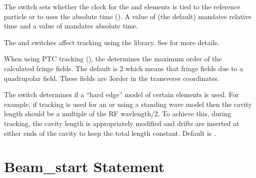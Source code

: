 The  switch sets whether the clock for the
 and  elements is tied to the reference
particle or to uses the absolute time (). A value of
 (the default) mandates relative time and a value of
 mandates absolute time.

The  and  switches affect
tracking using the  library. See  for more
details.

When using PTC tracking (), the
 determines the maximum order of
the calculated fringe fields. The default is 2 which means that fringe
fields due to a quadrupolar field. These fields are 3\Rd order in the
transverse coordinates.

The  switch determines if a ``hard edge''
model of certain elements is used. For example, if 
tracking is used for an  or  using a standing
wave model then the cavity length should be a multiple of the RF
wavlength/2. To achieve this, during tracking, the cavity length is
appropriately modified and drifts are inserted at either ends of the
cavity to keep the total length constant. Default is .

\section{Beam_start Statement} \label{s:beam.start}

